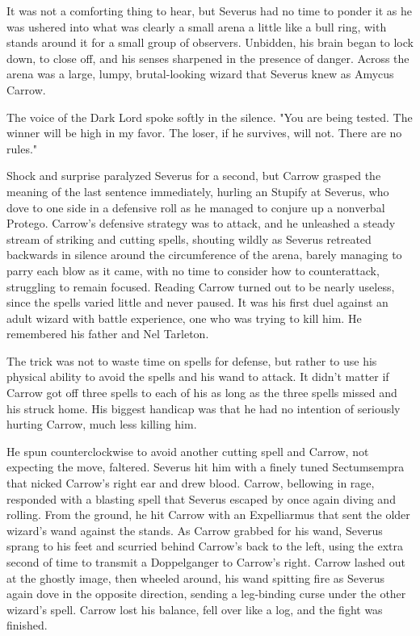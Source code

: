 \documentclass[a4paper,11pt]{article}
\begin{document}
It was not a comforting thing to hear, but Severus had no time to ponder it as he was ushered into what was clearly a small arena a little like a bull ring, with stands around it for a small group of observers. Unbidden, his brain began to lock down, to close off, and his senses sharpened in the presence of danger. Across the arena was a large, lumpy, brutal-looking wizard that Severus knew as Amycus Carrow.

The voice of the Dark Lord spoke softly in the silence. "You are being tested. The winner will be high in my favor. The loser, if he survives, will not. There are no rules."

Shock and surprise paralyzed Severus for a second, but Carrow grasped the meaning of the last sentence immediately, hurling an Stupify at Severus, who dove to one side in a defensive roll as he managed to conjure up a nonverbal Protego. Carrow's defensive strategy was to attack, and he unleashed a steady stream of striking and cutting spells, shouting wildly as Severus retreated backwards in silence around the circumference of the arena, barely managing to parry each blow as it came, with no time to consider how to counterattack, struggling to remain focused. Reading Carrow turned out to be nearly useless, since the spells varied little and never paused. It was his first duel against an adult wizard with battle experience, one who was trying to kill him. He remembered his father and Nel Tarleton.

The trick was not to waste time on spells for defense, but rather to use his physical ability to avoid the spells and his wand to attack. It didn't matter if Carrow got off three spells to each of his as long as the three spells missed and his struck home. His biggest handicap was that he had no intention of seriously hurting Carrow, much less killing him.

He spun counterclockwise to avoid another cutting spell and Carrow, not expecting the move, faltered. Severus hit him with a finely tuned Sectumsempra that nicked Carrow's right ear and drew blood. Carrow, bellowing in rage, responded with a blasting spell that Severus escaped by once again diving and rolling. From the ground, he hit Carrow with an Expelliarmus that sent the older wizard's wand against the stands. As Carrow grabbed for his wand, Severus sprang to his feet and scurried behind Carrow's back to the left, using the extra second of time to transmit a Doppelganger to Carrow's right. Carrow lashed out at the ghostly image, then wheeled around, his wand spitting fire as Severus again dove in the opposite direction, sending a leg-binding curse under the other wizard's spell. Carrow lost his balance, fell over like a log, and the fight was finished.
\end{document}
